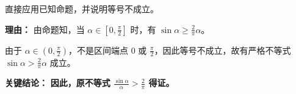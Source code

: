 \begin{examplebox}
\begin{description}[style=nextline, leftmargin=2.8em, labelsep=0.5em, itemsep=0.45em]
    \item[\textbf{第三步（应用结论）：}] 直接应用已知命题，并说明等号不成立。
    \par\textbf{理由：} 由命题知，当 $\alpha \in [0, \frac{\pi}{2}]$ 时，有 $\sin \alpha \geq \frac{2}{\pi} \alpha$。
    \par 由于 $\alpha \in (0, \frac{\pi}{2})$，不是区间端点 $0$ 或 $\frac{\pi}{2}$，因此等号不成立，故有严格不等式 $\sin \alpha > \frac{2}{\pi} \alpha$ 成立。
\end{description}

\textbf{\textcolor{CExample}{关键结论：}} \textbf{因此，原不等式 $\frac{\sin \alpha}{\alpha} > \frac{2}{\pi}$ 得证。}
\end{examplebox}
